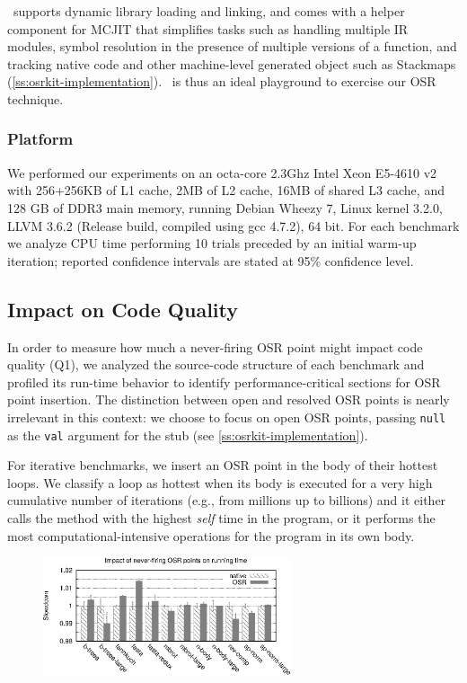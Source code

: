 \tinyvm\ supports dynamic library loading and linking, and comes with a helper component for MCJIT that simplifies tasks such as handling multiple IR modules, symbol resolution in the presence of multiple versions of a function, and tracking native code and other machine-level generated object such as Stackmaps (\mysection\ref{ss:osrkit-implementation}). \tinyvm\ is thus an ideal playground to exercise our OSR technique.

\subsubsection*{Platform}
We performed our experiments on an octa-core 2.3Ghz Intel Xeon E5-4610 v2 with 256+256KB of L1 cache, 2MB of L2 cache, 16MB of shared L3 cache, and 128 GB of DDR3 main memory, running Debian Wheezy 7, Linux kernel 3.2.0, LLVM 3.6.2 (Release build, compiled using gcc 4.7.2), 64 bit. For each benchmark we analyze CPU time performing 10 trials preceded by an initial warm-up iteration; reported confidence intervals are stated at 95\% confidence level.

\subsection{Impact on Code Quality}

In order to measure how much a never-firing OSR point might impact code quality (Q1), we analyzed the source-code structure of each benchmark and profiled its run-time behavior to identify performance-critical sections for OSR point insertion. The distinction between open and resolved OSR points is nearly irrelevant in this context: we choose to focus on open OSR points, passing {\tt null} as the {\tt val} argument for the stub (see \mysection\ref{ss:osrkit-implementation}).

For iterative benchmarks, we insert an OSR point in the body of their hottest loops. We classify a loop as hottest when its body is executed for a very high cumulative number of iterations (e.g., from millions up to billions) and it either calls the method with the highest {\em self} time in the program, or it performs the most computational-intensive operations for the program in its own body.

\ifdefined\noauthorea
\begin{figure}[t]
\begin{center}
\includegraphics[width=0.65\textwidth]{figures/osr-code-quality-base/osr-code-quality-base.eps}
\caption{\protect}
\end{center}
\end{figure}
\fi

